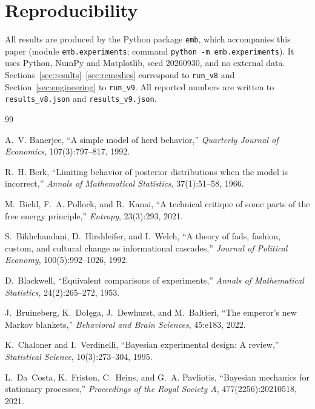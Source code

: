 \documentclass[11pt]{article}
\theoremstyle{definition}
\theoremstyle{remark}
\begin{document}
\appendix
\section{Reproducibility}
All results are produced by the Python package \texttt{emb}, which accompanies
this paper (module \texttt{emb.experiments}; command
\texttt{python -m emb.experiments}). It uses Python, NumPy and Matplotlib, seed
20260930, and no external data. Sections~\ref{sec:results}--\ref{sec:remedies}
correspond to \texttt{run\_v8} and Section~\ref{sec:engineering} to
\texttt{run\_v9}. All reported numbers are written to
\texttt{results\_v8.json} and \texttt{results\_v9.json}.

\begin{thebibliography}{99}\small

 A.~V. Banerjee, ``A simple model of herd behavior,''
\emph{Quarterly Journal of Economics}, 107(3):797--817, 1992.

 R.~H. Berk, ``Limiting behavior of posterior distributions
when the model is incorrect,'' \emph{Annals of Mathematical Statistics},
37(1):51--58, 1966.

 M.~Biehl, F.~A. Pollock, and R.~Kanai, ``A technical
critique of some parts of the free energy principle,'' \emph{Entropy}, 23(3):293,
2021.

 S.~Bikhchandani, D.~Hirshleifer, and I.~Welch, ``A
theory of fads, fashion, custom, and cultural change as informational
cascades,'' \emph{Journal of Political Economy}, 100(5):992--1026, 1992.

 D.~Blackwell, ``Equivalent comparisons of experiments,''
\emph{Annals of Mathematical Statistics}, 24(2):265--272, 1953.

 J.~Bruineberg, K.~Do{\l}{\selectfont\k{e}}ga, J.~Dewhurst, and
M.~Baltieri, ``The emperor's new Markov blankets,'' \emph{Behavioral and Brain
Sciences}, 45:e183, 2022.

 K.~Chaloner and I.~Verdinelli, ``Bayesian experimental
design: A review,'' \emph{Statistical Science}, 10(3):273--304, 1995.

 L.~Da~Costa, K.~Friston, C.~Heins, and G.~A.
Pavliotis, ``Bayesian mechanics for stationary processes,'' \emph{Proceedings of
the Royal Society A}, 477(2256):20210518, 2021.


\end{thebibliography}
\end{document}
